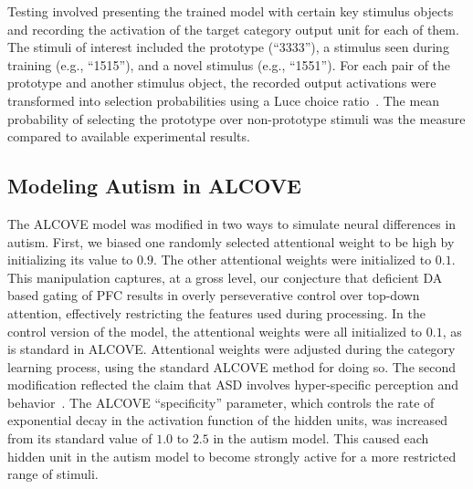 Testing involved presenting the trained model with certain key stimulus objects and recording the activation of the target category output unit for each of them. The stimuli of interest included the prototype (``3333''), a stimulus seen during training (e.g., ``1515''), and a novel stimulus (e.g., ``1551''). For each pair of the prototype and another stimulus object, the recorded output activations were transformed into selection probabilities using a Luce choice ratio~\cite{LuceRD:1963:Ratio}. The mean probability of selecting the prototype over non-prototype stimuli was the measure compared to available experimental results.


\subsection{Modeling Autism in ALCOVE}
The ALCOVE model was modified in two ways to simulate neural differences in autism. First, we biased one randomly selected attentional weight to be high by initializing its value to $0.9$. The other attentional weights were initialized to $0.1$. This manipulation captures, at a gross level, our conjecture that deficient DA based gating of PFC results in overly perseverative control over top-down attention, effectively restricting the features used during processing. In the control version of the model, the attentional weights were all initialized to $0.1$, as is standard in ALCOVE. Attentional weights were adjusted during the category learning process, using the standard ALCOVE method for doing so. The second modification reflected the claim that ASD involves hyper-specific perception and behavior~\cite{HappeF:1999:WCC}. The ALCOVE ``specificity'' parameter, which controls the rate of exponential decay in the activation function of the hidden units, was increased from its standard value of $1.0$ to $2.5$ in the autism model. This caused each hidden unit in the autism model to become strongly active for a more restricted range of stimuli.

